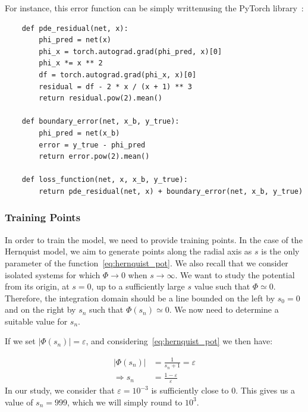 For instance, this error function can be simply written\footnotemark using the PyTorch library~\cite{NEURIPS2019_9015}:
\begin{verbatim}
    def pde_residual(net, x):
        phi_pred = net(x)
        phi_x = torch.autograd.grad(phi_pred, x)[0]
        phi_x *= x ** 2
        df = torch.autograd.grad(phi_x, x)[0]
        residual = df - 2 * x / (x + 1) ** 3
        return residual.pow(2).mean()

    def boundary_error(net, x_b, y_true):
        phi_pred = net(x_b)
        error = y_true - phi_pred
        return error.pow(2).mean()

    def loss_function(net, x, x_b, y_true):
        return pde_residual(net, x) + boundary_error(net, x_b, y_true)

\end{verbatim}

\subsubsection{Training Points}

In order to train the model, we need to provide training points. In the case of the Hernquist model, we aim to generate points along the radial axis as $s$ is the only parameter of the function~\eqref{eq:hernquist_pot}. We also recall that we consider isolated systems for which $\Phi \to 0$ when $s \to \infty$. We want to study the potential from its origin, at $s=0$, up to a sufficiently large $s$ value such that $\Phi \simeq 0$. Therefore, the integration domain should be a line bounded on the left by $s_0 = 0$ and on the right by $s_n$ such that $\Phi(s_n) \simeq 0$. We now need to determine a suitable value for $s_n$.
\par If we set $|\Phi(s_n)| = \varepsilon$, and considering~\eqref{eq:hernquist_pot} we then have:

\begin{align*}
\label{eq:final-value-hernquist}
    |\Phi(s_n)| &= \frac{1}{s_n + 1} = \varepsilon \\
    \Rightarrow s_n &= \frac{1 - \varepsilon}{\varepsilon}
\end{align*} In our study, we consider that $\varepsilon = 10^{-3}$ is sufficiently close to $0$. This gives us a value of $s_n=999$, which we will simply round to $10^3$.

